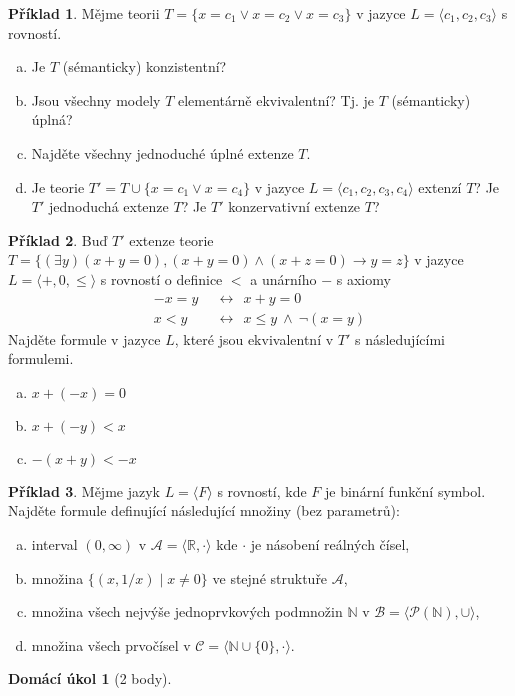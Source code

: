 \documentclass[a4paper]{article}
\theoremstyle{definition}
\newtheorem{problem}{Příklad}
\newtheorem*{ukol}{Domácí úkol}
\begin{document}
\medskip\begin{problem}
    Mějme teorii $T=\{x=c_1 \vee x=c_2 \vee x=c_3\}$ v jazyce $L=\langle c_1,c_2,c_3\rangle$ s rovností.
    \begin{enumerate}[(a)]
    \item Je $T$ (sémanticky) konzistentní?
    \item Jsou všechny modely $T$ elementárně ekvivalentní? Tj. je $T$ (sémanticky) úplná?
    \item Najděte všechny jednoduché úplné extenze $T$.
    \item Je teorie $T'=T\cup\{x=c_1 \vee x=c_4\}$ v jazyce $L=\langle c_1,c_2,c_3,c_4\rangle$ extenzí $T$? Je $T'$ jednoduchá extenze $T$? Je $T'$ konzervativní extenze $T$?
    \end{enumerate}
\end{problem}


\medskip\begin{problem}
Buď $T'$ extenze teorie $T=\{(\exists y)(x+y=0),(x+y=0)\wedge (x+z=0)\rightarrow y=z\}$ v jazyce $L=\langle +,0,\le\rangle$ s rovností o definice $<$ a unárního $-$ s axiomy
\begin{align*}
    -x=y\ \ &\leftrightarrow\ \ x+y=0\\
    x<y\ \ &\leftrightarrow\ \ x\le y\ \wedge\ \neg(x=y)
\end{align*}
Najděte formule v jazyce $L$, které jsou ekvivalentní v $T'$ s následujícími formulemi.
\begin{enumerate}[(a)]
    \item $x+(-x)=0$
    \item $x+(-y)<x$
    \item $-(x+y)<-x$
\end{enumerate}
\end{problem}


\medskip\begin{problem}
Mějme jazyk $L=\langle F \rangle$ s rovností, kde $F$ je binární funkční symbol. Najděte formule definující následující množiny (bez parametrů):
\begin{enumerate}[(a)]
    \item interval $(0,\infty)$ v $\mathcal A=\langle\mathbb R, \cdot\rangle$ kde $\cdot$ je násobení reálných čísel,
    \item množina $\{(x, 1/x)\mid x\neq 0\}$ ve stejné struktuře $\mathcal A$,
    \item množina všech nejvýše jednoprvkových podmnožin $\mathbb N$ v $\mathcal B=\langle\mathcal P(\mathbb N),\cup\rangle$,
    \item množina všech prvočísel v $\mathcal C=\langle \mathbb N\cup\{0\}, \cdot\rangle$.
\end{enumerate}
\end{problem}



\medskip\begin{ukol}[2 body]

\end{ukol}
\end{document}
